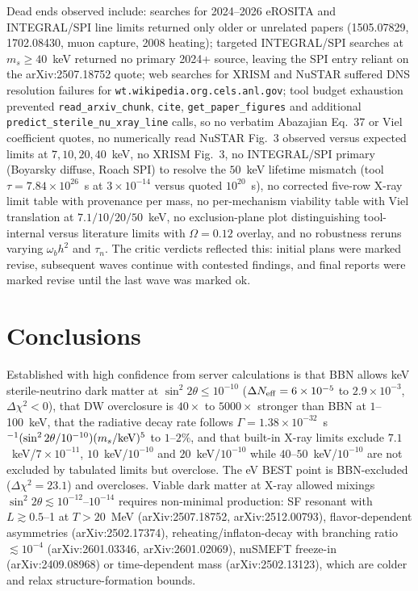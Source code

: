 \documentclass[11pt,a4paper]{article}
\begin{document}
Dead ends observed include: searches for 2024--2026 eROSITA and INTEGRAL/SPI line limits returned only older or unrelated papers (1505.07829, 1702.08430, muon capture, 2008 heating); targeted INTEGRAL/SPI searches at $m_{s}\ge40$~keV returned no primary 2024+ source, leaving the SPI entry reliant on the arXiv:2507.18752 quote; web searches for XRISM and NuSTAR suffered DNS resolution failures for \texttt{wt.wikipedia.org.cels.anl.gov}; tool budget exhaustion prevented \texttt{read\_arxiv\_chunk}, \texttt{cite}, \texttt{get\_paper\_figures} and additional \texttt{predict\_sterile\_nu\_xray\_line} calls, so no verbatim Abazajian Eq.~37 or Viel coefficient quotes, no numerically read NuSTAR Fig.~3 observed versus expected limits at $7,10,20,40$~keV, no XRISM Fig.~3, no INTEGRAL/SPI primary (Boyarsky diffuse, Roach SPI) to resolve the $50$~keV lifetime mismatch (tool $\tau=7.84\times10^{26}$~s at $3\times10^{-14}$ versus quoted $10^{20}$~s), no corrected five-row X-ray limit table with provenance per mass, no per-mechanism viability table with Viel translation at $7.1/10/20/50$~keV, no exclusion-plane plot distinguishing tool-internal versus literature limits with $\Omega=0.12$ overlay, and no robustness reruns varying $\omega_{b}h^{2}$ and $\tau_{n}$. The critic verdicts reflected this: initial plans were marked revise, subsequent waves continue with contested findings, and final reports were marked revise until the last wave was marked ok.

\section{Conclusions}
Established with high confidence from server calculations is that BBN allows keV sterile-neutrino dark matter at $\sin^{2}2\theta\le10^{-10}$ ($\Delta N_{\rm eff}=6\times10^{-5}$ to $2.9\times10^{-3}$, $\Delta\chi^{2}<0$), that DW overclosure is $40\times$ to $5000\times$ stronger than BBN at $1$--100~keV, that the radiative decay rate follows $\Gamma=1.38\times10^{-32}$~s$^{-1}(\sin^{2}2\theta/10^{-10})(m_{s}/{\rm keV})^{5}$ to $1$--$2\%$, and that built-in X-ray limits exclude $7.1$~keV/$7\times10^{-11}$, $10$~keV/$10^{-10}$ and $20$~keV/$10^{-10}$ while $40$--$50$~keV/$10^{-10}$ are not excluded by tabulated limits but overclose. The eV BEST point is BBN-excluded ($\Delta\chi^{2}=23.1$) and overcloses. Viable dark matter at X-ray allowed mixings $\sin^{2}2\theta\lesssim10^{-12}$--$10^{-14}$ requires non-minimal production: SF resonant with $L\gtrsim0.5$--1 at $T>20$~MeV (arXiv:2507.18752, arXiv:2512.00793), flavor-dependent asymmetries (arXiv:2502.17374), reheating/inflaton-decay with branching ratio $\lesssim10^{-4}$ (arXiv:2601.03346, arXiv:2601.02069), nuSMEFT freeze-in (arXiv:2409.08968) or time-dependent mass (arXiv:2502.13123), which are colder and relax structure-formation bounds.
\end{document}
